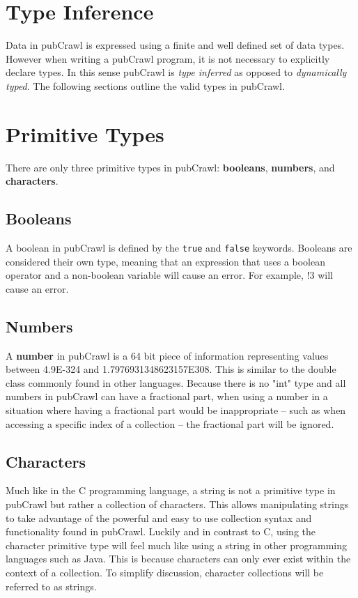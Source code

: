 \documentclass[oneside]{book}
\begin{document}
\section{Type Inference}
Data in pubCrawl is expressed using a finite and well defined set of data types. However when writing a pubCrawl program, it is not necessary to explicitly declare types. In this sense pubCrawl is \textit{type inferred} as opposed to \textit{dynamically typed}. The following sections outline the valid types in pubCrawl. 
\section{Primitive Types}
There are only three primitive types in pubCrawl: \textbf{booleans}, \textbf{numbers}, and \textbf{characters}. 

\subsection{Booleans}
A boolean in pubCrawl is defined by the \texttt{true} and \texttt{false} keywords. Booleans are considered their own type, meaning that an expression that uses a boolean operator and a non-boolean variable will cause an error. For example, !3 will cause an error. 

\subsection{Numbers}
A \textbf{number} in pubCrawl is a 64 bit piece of information representing values between 4.9E-324 and 1.7976931348623157E308. This is similar to the double class commonly found in other languages. Because there is no "int" type and all numbers in pubCrawl can have a fractional part, when using a number in a situation where having a fractional part would be inappropriate -- such as when accessing a specific index of a collection -- the fractional part will be ignored.

\subsection{Characters}
Much like in the C programming language, a string is not a primitive type in pubCrawl but rather a collection of characters. This allows manipulating strings to take advantage of the powerful and easy to use collection syntax and functionality found in pubCrawl. Luckily and in contrast to C, using the character primitive type will feel much like using a string in other programming languages such as Java. This is because characters can only ever exist within the context of a collection. To simplify discussion, character collections will be referred to as strings.
\end{document}

